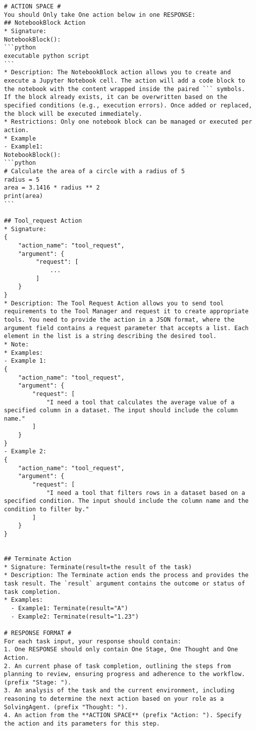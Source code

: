 \begin{tcolorbox}[title=Task Solver's Prompt, breakable, width=\textwidth,top=0mm]
\begin{Verbatim}[breaklines, fontsize=\footnotesize]
# ACTION SPACE #
You should Only take One action below in one RESPONSE:
## NotebookBlock Action
* Signature: 
NotebookBlock():
```python
executable python script
```
* Description: The NotebookBlock action allows you to create and execute a Jupyter Notebook cell. The action will add a code block to the notebook with the content wrapped inside the paired ``` symbols. If the block already exists, it can be overwritten based on the specified conditions (e.g., execution errors). Once added or replaced, the block will be executed immediately.
* Restrictions: Only one notebook block can be managed or executed per action.
* Example
- Example1: 
NotebookBlock():
```python
# Calculate the area of a circle with a radius of 5
radius = 5
area = 3.1416 * radius ** 2
print(area)
```

## Tool_request Action
* Signature:
{
    "action_name": "tool_request",
    "argument": {
         "request": [
             ...
         ]
    }
}
* Description: The Tool Request Action allows you to send tool requirements to the Tool Manager and request it to create appropriate tools. You need to provide the action in a JSON format, where the argument field contains a request parameter that accepts a list. Each element in the list is a string describing the desired tool.
* Note:
* Examples:
- Example 1:
{
    "action_name": "tool_request",
    "argument": {
        "request": [
            "I need a tool that calculates the average value of a specified column in a dataset. The input should include the column name."
        ]
    }
}
- Example 2:
{
    "action_name": "tool_request",
    "argument": {
        "request": [
            "I need a tool that filters rows in a dataset based on a specified condition. The input should include the column name and the condition to filter by."
        ]
    }
}


## Terminate Action
* Signature: Terminate(result=the result of the task)
* Description: The Terminate action ends the process and provides the task result. The `result` argument contains the outcome or status of task completion.
* Examples:
  - Example1: Terminate(result="A")
  - Example2: Terminate(result="1.23")

# RESPONSE FORMAT #
For each task input, your response should contain:
1. One RESPONSE should only contain One Stage, One Thought and One Action.
2. An current phase of task completion, outlining the steps from planning to review, ensuring progress and adherence to the workflow.  (prefix "Stage: ").
3. An analysis of the task and the current environment, including reasoning to determine the next action based on your role as a SolvingAgent. (prefix "Thought: ").
4. An action from the **ACTION SPACE** (prefix "Action: "). Specify the action and its parameters for this step.


\end{Verbatim}
\end{tcolorbox}

